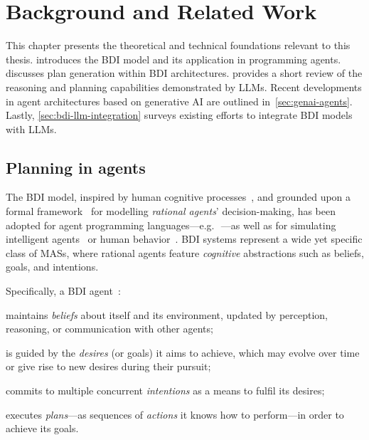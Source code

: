\documentclass[12pt,a4paper,openright,twoside]{book}
\begin{document}
\chapter{Background and Related Work}\label{chap:background}

This chapter presents the theoretical and technical foundations relevant to this thesis.
%
 introduces the \ac{BDI} model and its application in programming \agentspeak{} agents. 
%
 discusses plan generation within \ac{BDI} architectures.
%
 provides a short review of the reasoning and planning capabilities demonstrated by \acp{LLM}. 
%
Recent developments in agent architectures based on generative AI are outlined in~\cref{sec:genai-agents}. 
%
Lastly, \cref{sec:bdi-llm-integration} surveys existing efforts to integrate \ac{BDI} models with \acp{LLM}.

\section{Planning in \agentspeak{} agents}\label{sec:planning-bdi}

The \ac{BDI} model, inspired by human cognitive processes~\cite{BratmanEtAl1987}, and grounded upon a formal framework~\cite{bdilogic-jlc8} for modelling \emph{rational agents}' decision-making, has been adopted for agent programming languages---e.g.\,~\cite{BordiniHW2007}---as well as for simulating intelligent agents~\cite{HubnerB09} or human behavior~\cite{AdamGaudou2016}.
%
\ac{BDI} systems represent a wide yet specific class of \acp{MAS}, where rational agents feature \emph{cognitive} abstractions such as beliefs, goals, and intentions.

Specifically, a \ac{BDI} agent~\cite{RaoG95}:
%
\begin{inlinelist}
    \item maintains \emph{beliefs} about itself and its environment,
    updated by perception, reasoning, or communication with other agents;
    \item is guided by the \emph{desires} (or goals) it aims to achieve,
    which may evolve over time or give rise to new desires during their pursuit;
    \item commits to multiple concurrent \emph{intentions} as a means to fulfil its desires;
    \item executes \emph{plans}---as sequences of \emph{actions} it knows how to perform---in  order to achieve its goals.
\end{inlinelist}
\end{document}
